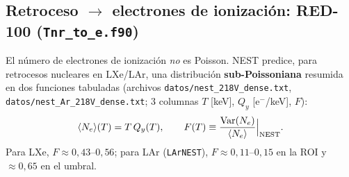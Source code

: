 \documentclass[11pt,a4paper]{article}
\newcommand{\Tnr}{T}
\newcommand{\Ne}{N_{e}}
\newcommand{\code}[1]{\texttt{#1}}
\begin{document}
\subsection{Retroceso $\to$ electrones de ionizaci\'on: RED-100 (\code{Tnr\_to\_e.f90})}
\label{sec:nest}

El n\'umero de electrones de ionizaci\'on \emph{no} es Poisson. NEST predice,
para retrocesos nucleares en LXe/LAr, una distribuci\'on \textbf{sub-Poissoniana}
resumida en dos funciones tabuladas (archivos \code{datos/nest\_218V\_dense.txt},
\code{datos/nest\_Ar\_218V\_dense.txt}; 3 columnas $\Tnr$ [keV], $Q_{y}$
[e$^{-}$/keV], $F$):
\begin{equation}
  \label{eq:nest_tab}
  \langle\Ne\rangle(\Tnr) = \Tnr\,Q_{y}(\Tnr),
  \qquad
  F(\Tnr) \equiv \frac{\operatorname{Var}(\Ne)}{\langle\Ne\rangle}\Big|_{\rm NEST}.
\end{equation}
Para LXe, $F\approx 0{,}43$--$0{,}56$; para LAr (\code{LArNEST}),
$F\approx 0{,}11$--$0{,}15$ en la ROI y $\approx 0{,}65$ en el umbral.
\end{document}
